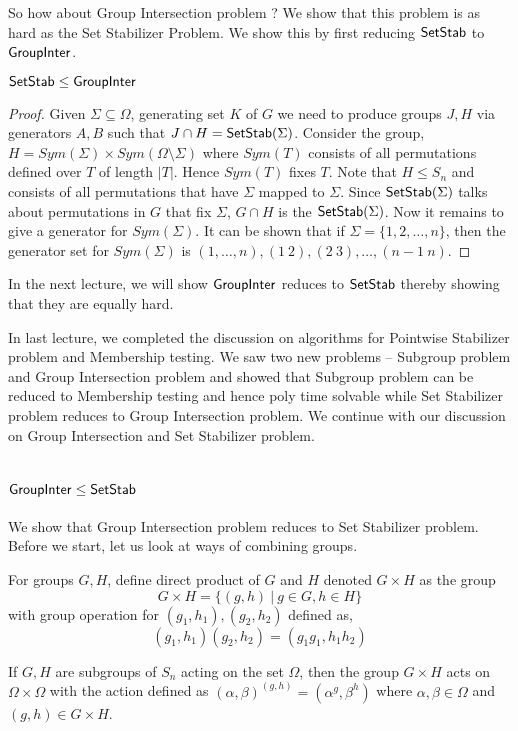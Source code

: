 So how about Group Intersection problem ? We show that this problem is as hard
as the Set Stabilizer Problem. We show this by first reducing ${\sf SetStab}$ to
${\sf GroupInter}$.
\begin{claim}
${\sf SetStab} \le {\sf GroupInter}$
\end{claim}
\begin{proof}
	Given $\Sigma \subseteq \Omega$, generating set $K$ of $G$ we need to
	produce groups $J,H$ via generators $A,B$ such that $J \cap H =
	{\sf SetStab}(\Sigma)$. Consider the group, $H = Sym(\Sigma) \times
	Sym(\Omega \setminus \Sigma)$ where $Sym(T)$  
	consists of all permutations defined over $T$ of length $|T|$. Hence
	$Sym(T)$ fixes $T$. Note that $H \le S_n$ and consists of all
	permutations that have $\Sigma$ mapped to $\Sigma$. Since
	${\sf SetStab}(\Sigma)$ talks about permutations in $G$ that fix $\Sigma$,
	$G \cap H$ is the ${\sf SetStab}(\Sigma)$. Now it remains to give a
	generator for $Sym(\Sigma)$. It can be shown that if $\Sigma
	=\{1,2,\ldots,n\}$, then the generator set for $Sym(\Sigma)$ is
	$(1,\ldots, n), (1~2),(2~3),
	\ldots, (n-1~ n)$.
\end{proof}
In the next lecture, we will show ${\sf GroupInter}$ reduces to ${\sf SetStab}$ thereby
showing that they are equally hard.


In last lecture, we completed the discussion on algorithms for Pointwise
Stabilizer problem and Membership testing. We saw two new problems -- Subgroup
problem and Group Intersection problem and showed that Subgroup problem can be
reduced to Membership testing and hence poly time solvable while Set Stabilizer
problem reduces to Group Intersection problem. We continue with our discussion
on Group Intersection and Set Stabilizer problem.

\section{${\sf GroupInter} \le {\sf SetStab}$}
We show that Group Intersection problem reduces to Set Stabilizer problem. 
Before we start, let us look at ways of combining groups.
\begin{definition}
For groups $G,H$, define direct product of $G$ and $H$ denoted $G \times H$ as
the group 
\[ G \times H = \{(g,h) ~|~ g \in G,h \in H\} \]
with group operation for $(g_1, h_1), (g_2,h_2)$ defined as,
\[ (g_1,h_1)(g_2,h_2) = (g_1g_1,h_1h_2) \]

If $G,H$ are subgroups of $S_n$ acting on the set $\Omega$, then the group $G
\times H$ acts on $\Omega \times \Omega$ with the action defined as
$(\alpha,\beta)^{(g,h)}=(\alpha^g,\beta^h)$
where $\alpha, \beta \in \Omega$ and $(g,h) \in G \times H$.
\end{definition}

